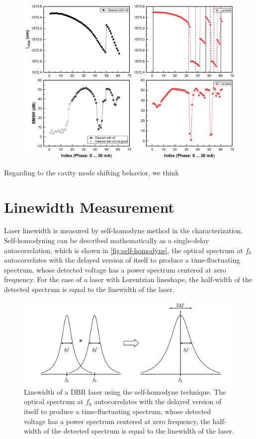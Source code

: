 \begin{figure}[ht]
    \centering
    \includegraphics[width=\linewidth]{figures/OSA_and_SMSR.png}
    \caption{}
    \label{fig:OSA_and_SMSR}
\end{figure}

Regarding to the cavity mode shifting behavior, we think 



\section{Linewidth Measurement}\label{sec:linewidth_measurement}
Laser linewidth is measured by self-homodyne method in the characterization. Self-homodyning can be described mathematically as a single-delay autocorrelation, which is shown in \autoref{fig:self-homodyne}, the optical spectrum at $f_0$ autocorrelates with the delayed version of itself to produce a time-fluctuating spectrum, whose detected voltage has a power spectrum centered at zero frequency. For the case of a laser with Lorentzian lineshape, the half-width of the detected spectrum is equal to the linewidth of the laser.
\begin{figure}[ht]
    \centering
    \includegraphics[width=.8\linewidth]{figures/self-homodyne.png}
    \caption{Linewidth of a DBR laser using the self-homodyne technique. The optical spectrum at $f_0$ autocorrelates with the delayed version of itself to produce a time-fluctuating spectrum, whose detected voltage has a power spectrum centered at zero frequency, the half-width of the detected spectrum is equal to the linewidth of the laser.}
    \label{fig:self-homodyne}
\end{figure}

